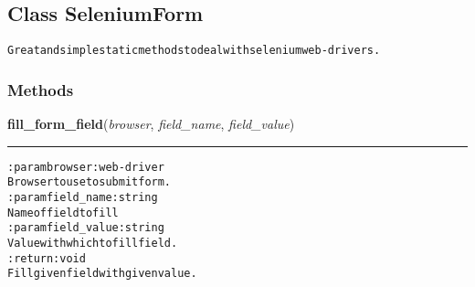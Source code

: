 \subsection{Class SeleniumForm}

    \label{hal:internet:selenium_bots:SeleniumForm}
\begin{alltt}
Great and simple static methods to deal with selenium web-drivers. 
\end{alltt}



  \subsubsection{Methods}

    \label{hal:internet:selenium_bots:SeleniumForm:fill_form_field}

    \vspace{0.5ex}

\hspace{.8\funcindent}\begin{boxedminipage}{\funcwidth}

    \raggedright \textbf{fill\_form\_field}(\textit{browser}, \textit{field\_name}, \textit{field\_value})

    \vspace{-1.5ex}

    \rule{\textwidth}{0.5\fboxrule}
\setlength{\parskip}{2ex}
\begin{alltt}

:param browser: web-driver
    Browser to use to submit form.
:param field\_name :string
    Name of field to fill
:param field\_value: string
    Value with which to fill field.
:return: void
    Fill given field with given value.
\end{alltt}

\setlength{\parskip}{1ex}
    \end{boxedminipage}

    \label{hal:internet:selenium_bots:SeleniumForm:fill_login_form}

